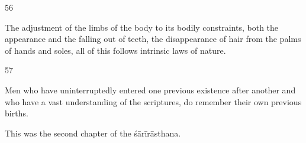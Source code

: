 \begin{translation}
\begin{tt}
\item[56]

 The adjustment of the limbs of the body to its bodily constraints, both 
  the appearance and the falling out of teeth, the disappearance of hair from the 
  palms of hands and soles, all of this follows intrinsic laws of nature.
  
\item[57]

 Men who have uninterruptedly entered one previous existence after 
  another and who have a vast understanding of the scriptures, do remember 
  their own previous births.
  
  This was the second chapter of the śārīrāsthana.
  
\end{tt}
\end{translation}
